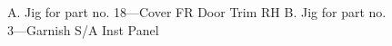 \documentclass[a4paper,10pt]{article}
\begin{document}
\begin{figure}[ht!]
\centering {}
\captionsetup{singlelinecheck=off}
\caption[jigs]{A. Jig for part no. 18---Cover FR Door Trim RH B. Jig for part no. 3---Garnish S/A Inst Panel}
\label{fig:Jigs} 
\end{figure}
\end{document}
